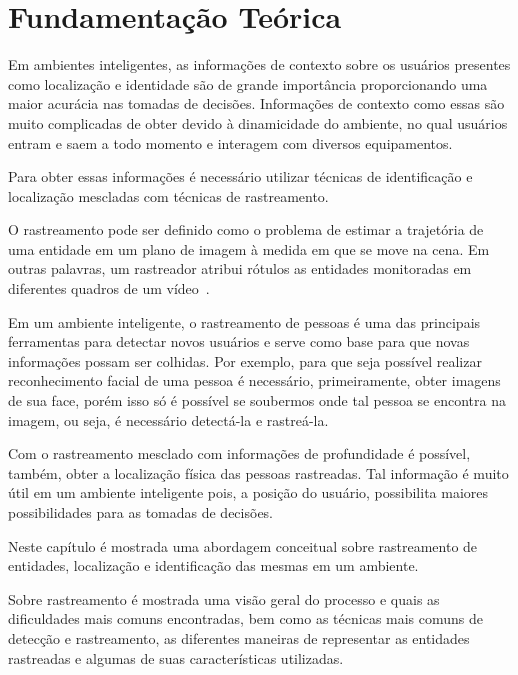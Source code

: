 \chapter{Fundamentação Teórica}
\label{cap:fundamentacao}


	Em ambientes inteligentes, as informações de contexto sobre os usuários presentes como localização e identidade são de grande importância proporcionando uma maior acurácia nas tomadas de decisões. Informações de contexto como essas são muito complicadas de obter devido à dinamicidade do ambiente, no qual usuários entram e saem a todo momento e interagem com diversos equipamentos.

	Para obter essas informações é necessário utilizar técnicas de identificação e localização mescladas com técnicas de rastreamento.

	O rastreamento pode ser definido como o problema de estimar a trajetória de uma entidade em um plano de imagem à medida em que se move na cena. Em outras palavras, um rastreador atribui rótulos as entidades monitoradas em diferentes quadros de um vídeo~\cite{yilmaz}.

	Em um ambiente inteligente, o rastreamento de pessoas é uma das principais ferramentas para detectar novos usuários e serve como base para que novas informações possam ser colhidas. Por exemplo, para que seja possível realizar reconhecimento facial de uma pessoa é necessário, primeiramente, obter imagens de sua face, porém isso só é possível se soubermos onde tal pessoa se encontra na imagem, ou seja, é necessário detectá-la e rastreá-la.

	Com o rastreamento mesclado com informações de profundidade é possível, também, obter a localização física das pessoas rastreadas. Tal informação é muito útil em um ambiente inteligente pois, a posição do usuário, possibilita maiores possibilidades para as tomadas de decisões.

	Neste capítulo é mostrada uma abordagem conceitual sobre rastreamento de entidades, localização e identificação das mesmas em um ambiente. 

	Sobre rastreamento é mostrada uma visão geral do processo e quais as dificuldades mais comuns encontradas, bem como as técnicas mais comuns de detecção e rastreamento, as diferentes maneiras de representar as entidades rastreadas e algumas de suas características utilizadas. 

